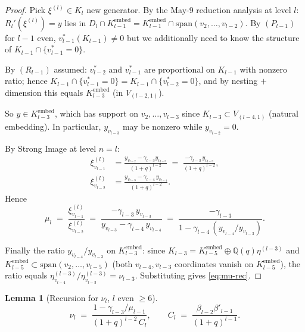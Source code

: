 \documentclass[11pt]{article}
\newtheorem{lemma}[theorem]{Lemma}
\theoremstyle{definition}
\begin{document}
\begin{proof}
Pick $\xi^{(l)} \in K_l$ new generator. By the May-9 reduction
analysis at level $l$: $R_l'(\xi^{(l)}) = y$ lies in
$D_l \cap K_{l-1}^{\mathrm{embed}} = K_{l-1}^{\mathrm{embed}} \cap
\mathrm{span}(v_2,\ldots,v_{l-2})$.  By $(P_{l-1})$ for $l-1$ even,
$v_{l-1}^*(K_{l-1}) \neq 0$ but we additionally need to know the
structure of $K_{l-1}\cap\{v_{l-1}^*=0\}$.

By $(R_{l-1})$ assumed: $v_{l-2}^*$ and $v_{l-1}^*$ are proportional
on $K_{l-1}$ with nonzero ratio; hence
$K_{l-1} \cap \{v_{l-1}^*=0\} = K_{l-1}\cap\{v_{l-2}^*=0\}$, and by
nesting $+$ dimension this equals $K_{l-3}^{\mathrm{embed}}$
(in $V_{(l-2,1)}$).

So $y \in K_{l-3}^{\mathrm{embed}}$, which has support on
$v_2,\ldots,v_{l-3}$ since $K_{l-3} \subset V_{(l-4,1)}$
(natural embedding).  In particular, $y_{v_{l-3}}$ may be nonzero
while $y_{v_{l-2}} = 0$.

By Strong Image at level $n = l$:
\begin{align*}
\xi^{(l)}_{v_{l-1}} &= \frac{y_{v_{l-2}} - \gamma_{l-3} y_{v_{l-3}}}{(1+q)^{l-2}}
                   \;=\; \frac{-\gamma_{l-3}\, y_{v_{l-3}}}{(1+q)^{l-2}},\\
\xi^{(l)}_{v_{l-2}} &= \frac{y_{v_{l-3}} - \gamma_{l-4}\, y_{v_{l-4}}}{(1+q)^{l-2}}.
\end{align*}
Hence
\[
   \mu_l \;=\; \frac{\xi^{(l)}_{v_{l-1}}}{\xi^{(l)}_{v_{l-2}}}
   \;=\; \frac{-\gamma_{l-3}\, y_{v_{l-3}}}{y_{v_{l-3}} - \gamma_{l-4}\, y_{v_{l-4}}}
   \;=\; \frac{-\gamma_{l-3}}{1 - \gamma_{l-4}\,(y_{v_{l-4}}/y_{v_{l-3}})}.
\]

Finally the ratio $y_{v_{l-4}}/y_{v_{l-3}}$ on $K_{l-3}^{\mathrm{embed}}$:
since $K_{l-3} = K_{l-5}^{\mathrm{embed}} \oplus \mathbb{Q}(q)\eta^{(l-3)}$
and $K_{l-5}^{\mathrm{embed}} \subset \mathrm{span}(v_2,\ldots,v_{l-5})$
(both $v_{l-4}, v_{l-3}$ coordinates vanish on $K_{l-5}^{\mathrm{embed}}$),
the ratio equals $\eta^{(l-3)}_{v_{l-4}}/\eta^{(l-3)}_{v_{l-3}} =
\nu_{l-3}$.  Substituting gives \eqref{eq:mu-rec}.
\end{proof}

\begin{lemma}[Recursion for $\nu_l$, $l$ even $\ge 6$]\label{lem:nu-rec}
\begin{equation}\label{eq:nu-rec}
   \nu_l \;=\; \frac{1 - \gamma_{l-3}/\mu_{l-1}}{(1+q)^{l-2}\, C_l},
   \qquad
   C_l \;=\; \frac{\beta_{l-2}\beta'_{l-1}}{(1+q)^{l-1}}.
\end{equation}
\end{lemma}
\end{document}

